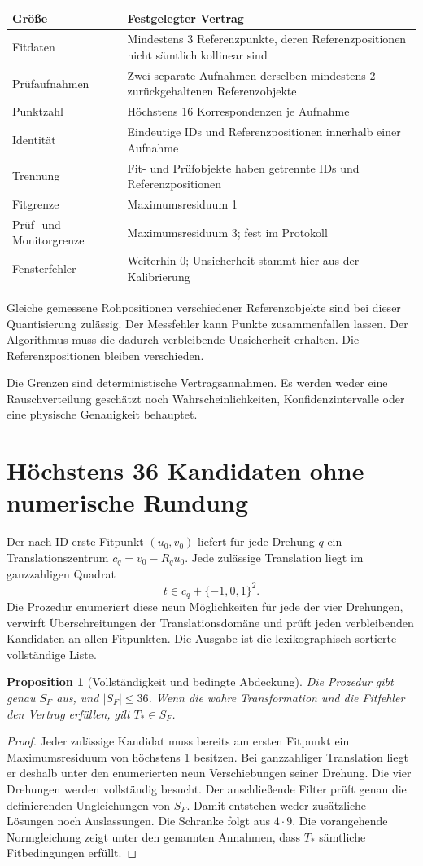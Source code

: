 \documentclass[11pt,a4paper]{article}
\newcommand{\nextsection}[2]{\clearpage{\color{accent}\small\textsf{#1}}\section{#2}}
\newtheorem{proposition}{Proposition}[section]
\begin{document}
\begin{tabularx}{\linewidth}{@{}lY@{}}
\toprule
Größe & Festgelegter Vertrag\\\midrule
Fitdaten & Mindestens 3 Referenzpunkte, deren Referenzpositionen nicht sämtlich kollinear sind\\
Prüfaufnahmen & Zwei separate Aufnahmen derselben mindestens 2 zurückgehaltenen Referenzobjekte\\
Punktzahl & Höchstens 16 Korrespondenzen je Aufnahme\\
Identität & Eindeutige IDs und Referenzpositionen innerhalb einer Aufnahme\\
Trennung & Fit- und Prüfobjekte haben getrennte IDs und Referenzpositionen\\
Fitgrenze & Maximumsresiduum 1\\
Prüf- und Monitorgrenze & Maximumsresiduum 3; fest im Protokoll\\
Fensterfehler & Weiterhin 0; Unsicherheit stammt hier aus der Kalibrierung\\
\bottomrule
\end{tabularx}


Gleiche gemessene Rohpositionen verschiedener Referenzobjekte
sind bei dieser Quantisierung zulässig. Der Messfehler kann Punkte
zusammenfallen lassen. Der Algorithmus muss die dadurch verbleibende
Unsicherheit erhalten. Die Referenzpositionen bleiben verschieden.

Die Grenzen sind deterministische Vertragsannahmen. Es werden weder
eine Rauschverteilung geschätzt noch Wahrscheinlichkeiten,
Konfidenzintervalle oder eine physische Genauigkeit behauptet.

\nextsection{61 / VOLLSTÄNDIGE ENUMERATION}{Höchstens 36 Kandidaten ohne numerische Rundung}
Der nach ID erste Fitpunkt $(u_0,v_0)$ liefert für jede Drehung
$q$ ein Translationszentrum $c_q=v_0-R_qu_0$. Jede zulässige
Translation liegt im ganzzahligen Quadrat
\[
 t\in c_q+\{-1,0,1\}^2.
\]
Die Prozedur enumeriert diese neun Möglichkeiten für jede der vier
Drehungen, verwirft Überschreitungen der Translationsdomäne und
prüft jeden verbleibenden Kandidaten an allen Fitpunkten.
Die Ausgabe ist die lexikographisch sortierte vollständige Liste.

\begin{proposition}[Vollständigkeit und bedingte Abdeckung]
Die Prozedur gibt genau $S_F$ aus, und $|S_F|\leq36$.
Wenn die wahre Transformation und die Fitfehler den Vertrag erfüllen,
gilt $T_*\in S_F$.
\end{proposition}
\begin{proof}
Jeder zulässige Kandidat muss bereits am ersten Fitpunkt ein
Maximumsresiduum von höchstens 1 besitzen. Bei ganzzahliger
Translation liegt er deshalb unter den enumerierten neun
Verschiebungen seiner Drehung. Die vier Drehungen werden vollständig
besucht. Der anschließende Filter prüft genau die definierenden
Ungleichungen von $S_F$. Damit entstehen weder zusätzliche Lösungen
noch Auslassungen. Die Schranke folgt aus $4\cdot9$.
Die vorangehende Normgleichung zeigt unter den genannten Annahmen,
dass $T_*$ sämtliche Fitbedingungen erfüllt.
\end{proof}
\end{document}
